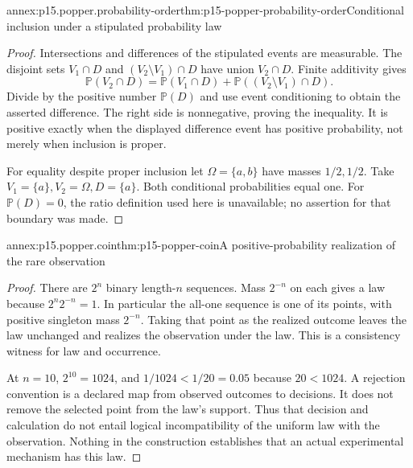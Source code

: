 \begin{annexitem}{annex:p15.popper.probability-order}{thm:p15-popper-probability-order}{Conditional inclusion under a stipulated probability law}
\begin{proof}
Intersections and differences of the stipulated events are measurable.
The disjoint sets \(V_1\cap D\) and
\((V_2\setminus V_1)\cap D\) have union \(V_2\cap D\).
Finite additivity gives
\[
\mathbb P(V_2\cap D)
=\mathbb P(V_1\cap D)+
 \mathbb P((V_2\setminus V_1)\cap D).
\]
Divide by the positive number \(\mathbb P(D)\) and use
event conditioning to obtain the asserted difference.
The right side is nonnegative, proving the inequality.
It is positive exactly when the displayed difference event
has positive probability, not merely when inclusion is proper.

For equality despite proper inclusion let
\(\Omega=\{a,b\}\) have masses \(1/2,1/2\).
Take \(V_1=\{a\},V_2=\Omega,D=\{a\}\).
Both conditional probabilities equal one.
For \(\mathbb P(D)=0\), the ratio definition used here is
unavailable; no assertion for that boundary was made.
\end{proof}
\end{annexitem}

\begin{annexitem}{annex:p15.popper.coin}{thm:p15-popper-coin}{A positive-probability realization of the rare observation}
\begin{proof}
There are \(2^n\) binary length-\(n\) sequences.
Mass \(2^{-n}\) on each gives a law because
\(2^n2^{-n}=1\). In particular the all-one sequence is
one of its points, with positive singleton mass \(2^{-n}\).
Taking that point as the realized outcome leaves the law unchanged
and realizes the observation under the law.
This is a consistency witness for law and occurrence.

At \(n=10\), \(2^{10}=1024\), and
\(1/1024<1/20=0.05\) because \(20<1024\).
A rejection convention is a declared map from observed outcomes
to decisions. It does not remove the selected point from the
law's support. Thus that decision and calculation do not entail
logical incompatibility of the uniform law with the observation.
Nothing in the construction establishes that an actual
experimental mechanism has this law.
\end{proof}
\end{annexitem}
